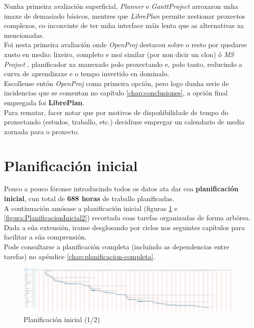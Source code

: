 Nunha primeira avaliación superficial, \textit{Planner} e \textit{GanttProject}
arroxaron unha imaxe de demasiado básicos, mentres que \textit{LibrePlan}
permite xestionar proxectos complexos, co inconvinte de ter unha interface máis
lenta que as alternativas xa mencionadas. \\

Foi nesta primeira avaliación onde \textit{OpenProj} destacou sobre o resto por
quedarse xusto en medio: lixeiro, completo e moi similar (por non dicir un
clon) ó \textit{MS Project} \cite{MSProject}, planificador xa manexado polo
proxectando e, polo tanto, reducindo a curva de aprendizaxe e o tempo invertido
en dominalo. \\

Escolleuse entón \textit{OpenProj} coma primeira opción, pero logo dunha serie
de incidencias que se comentan no capítulo \ref{chap:conclusiones}, a opción
final empregada foi \textbf{LibrePlan}. \\

Para rematar, facer notar que por motivos de dispoñibilidade de tempo do
proxectando (estudos, traballo, etc.) decidiuse empregar un calendario de media
xornada para o proxecto.

\section{Planificación inicial}

Pouco a pouco fóronse introducindo todos os datos ata dar coa
\textbf{planificación inicial}, cun total de \textbf{688 horas} de traballo
planificadas. \\

A continuación amósase a planificación inicial (figuras
\ref{figura:PlanificacionInicial1} e \ref{figura:PlanificacionInicial2})
recortada coas tarefas organizadas de forma arbórea. Dada a súa extensión,
iranse desglosando por ciclos nos seguintes capítulos para facilitar a súa
comprensión. \\

Pode consultarse a planificación completa (incluíndo as dependencias entre
tarefas) no apéndice \ref{chap:planificacion-completa}.

\begin{figure}[htbp]
 \centering
 \includegraphics[trim=0 20cm 230cm 0,clip=true,scale=0.6,keepaspectratio=true]{./imagenes/planificacion-inicial.png}
 \caption[Planificación inicial (1/2)]{Planificación inicial (1/2) \cite{LibrePlan}}
 \label{figura:PlanificacionInicial1}
\end{figure}

